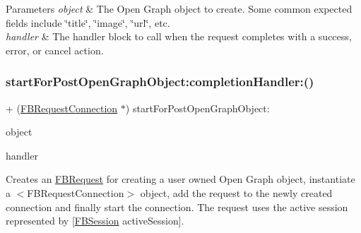 \begin{DoxyParams}{Parameters}
{\em object} & The Open Graph object to create. Some common expected fields include \char`\"{}title\char`\"{}, \char`\"{}image\char`\"{}, \char`\"{}url\char`\"{}, etc.\\
\hline
{\em handler} & The handler block to call when the request completes with a success, error, or cancel action. \\
\hline
\end{DoxyParams}
\mbox{\label{interfaceFBRequestConnection_aa592bef80bf5a2450be91fc9538b65bd}} 
\subsubsection{\texorpdfstring{start\+For\+Post\+Open\+Graph\+Object\+:completion\+Handler\+:()}{startForPostOpenGraphObject:completionHandler:()}\hspace{0.1cm}{\footnotesize\ttfamily [5/5]}}
{\footnotesize\ttfamily + (\hyperlink{interfaceFBRequestConnection}{F\+B\+Request\+Connection} $\ast$) start\+For\+Post\+Open\+Graph\+Object\+: \begin{DoxyParamCaption}\item[{(id$<$ \hyperlink{protocolFBOpenGraphObject-p}{F\+B\+Open\+Graph\+Object} $>$)}]{object }\item[{completionHandler:(F\+B\+Request\+Handler)}]{handler }\end{DoxyParamCaption}}

Creates an {\ttfamily \hyperlink{interfaceFBRequest}{F\+B\+Request}} for creating a user owned Open Graph object, instantiate a $<$\+F\+B\+Request\+Connection$>$ object, add the request to the newly created connection and finally start the connection. The request uses the active session represented by {\ttfamily \mbox{[}\hyperlink{interfaceFBSession}{F\+B\+Session} active\+Session\mbox{]}}.



